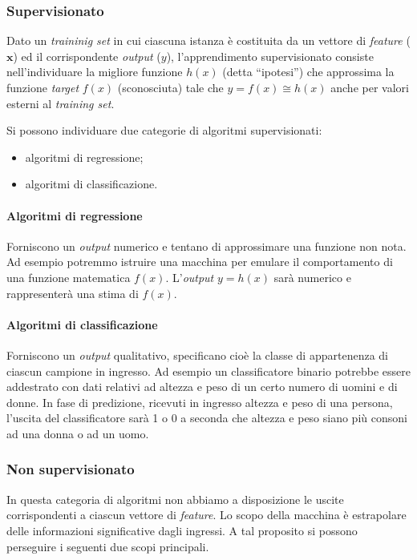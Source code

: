\subsubsection{Supervisionato}
Dato un \emph{traininig set} in cui ciascuna istanza è costituita da un vettore di \emph{feature} ($\mathbf{x}$) ed il corrispondente \emph{output} ($y$), l'apprendimento supervisionato consiste nell'individuare la migliore funzione  $h(x)$ (detta ``ipotesi'') che approssima la funzione \emph{target} $f(x)$ (sconosciuta) tale che $y = f(x) \cong h(x)$ anche per valori esterni al \emph{training set}.

Si possono individuare due categorie di algoritmi supervisionati:
\begin{itemize}
\item algoritmi di regressione;
\item algoritmi di classificazione.
\end{itemize}


\paragraph{Algoritmi di regressione} Forniscono un \emph{output} numerico e tentano di approssimare una funzione non nota. Ad esempio potremmo istruire una macchina per emulare il comportamento di una funzione matematica $f(x)$. L'\emph{output} $y=h(x)$ sarà numerico e rappresenterà una stima di $f(x)$.

\paragraph{Algoritmi di classificazione} Forniscono un \emph{output} qualitativo, specificano cioè la classe di appartenenza di ciascun campione in ingresso. Ad esempio un classificatore binario potrebbe essere addestrato con dati relativi ad altezza e peso di un certo numero di uomini e di donne. In fase di predizione, ricevuti in ingresso altezza e peso di una persona, l'uscita del classificatore sarà 1 o 0 a seconda che altezza e peso siano più consoni ad una donna o ad un uomo.

\subsubsection{Non supervisionato}
In questa categoria di algoritmi non abbiamo a disposizione le uscite corrispondenti a ciascun vettore di \emph{feature}. Lo scopo della macchina è estrapolare delle informazioni significative dagli ingressi. A tal proposito si possono perseguire i seguenti due scopi principali.

